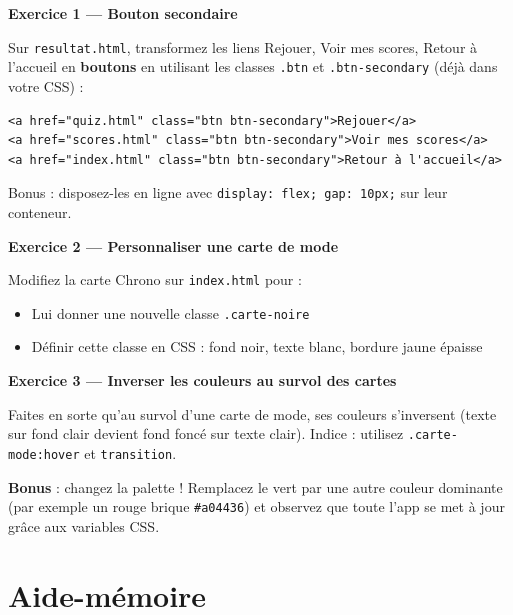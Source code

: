 \documentclass[11pt,a4paper]{article}
\begin{document}
\begin{objectifbox}

\textbf{Exercice 1 --- Bouton secondaire}

Sur \texttt{resultat.html}, transformez les liens
\og{}Rejouer\fg{}, \og{}Voir mes scores\fg{}, \og{}Retour à l'accueil\fg{}
en \textbf{boutons} en utilisant les classes \texttt{.btn} et
\texttt{.btn-secondary} (déjà dans votre CSS) :

\begin{lstlisting}[language=HTML5]
<a href="quiz.html" class="btn btn-secondary">Rejouer</a>
<a href="scores.html" class="btn btn-secondary">Voir mes scores</a>
<a href="index.html" class="btn btn-secondary">Retour à l'accueil</a>
\end{lstlisting}

Bonus : disposez-les en ligne avec \texttt{display: flex; gap: 10px;} sur
leur conteneur.

\medskip

\textbf{Exercice 2 --- Personnaliser une carte de mode}

Modifiez la carte \og{}Chrono\fg{} sur \texttt{index.html} pour :
\begin{itemize}[nosep]
    \item Lui donner une nouvelle classe \texttt{.carte-noire}
    \item Définir cette classe en CSS : fond noir, texte blanc, bordure jaune épaisse
\end{itemize}

\medskip

\textbf{Exercice 3 --- Inverser les couleurs au survol des cartes}

Faites en sorte qu'au survol d'une carte de mode, ses couleurs
s'inversent (texte sur fond clair devient fond foncé sur texte clair).
Indice : utilisez \texttt{.carte-mode:hover} et \texttt{transition}.

\medskip

\textbf{Bonus} : changez la palette ! Remplacez le vert par une autre
couleur dominante (par exemple un rouge brique \texttt{\#a04436}) et
observez que toute l'app se met à jour grâce aux variables CSS.
\end{objectifbox}

\newpage

\section{Aide-mémoire}
\end{document}
